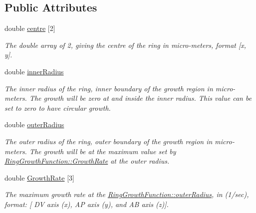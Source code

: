 \subsection*{Public Attributes}
\begin{DoxyCompactItemize}
\item 
\hypertarget{classRingGrowthFunction_a5b8f1cc72d03907bb1492e6c2f288db0}{}double \hyperlink{classRingGrowthFunction_a5b8f1cc72d03907bb1492e6c2f288db0}{centre} \mbox{[}2\mbox{]}\label{classRingGrowthFunction_a5b8f1cc72d03907bb1492e6c2f288db0}

\begin{DoxyCompactList}\small\item\em The double array of 2, giving the centre of the ring in micro-\/meters, format \mbox{[}x, y\mbox{]}. \end{DoxyCompactList}\item 
\hypertarget{classRingGrowthFunction_a4e8796fbbbe9fe18c2dcd04613effcf0}{}double \hyperlink{classRingGrowthFunction_a4e8796fbbbe9fe18c2dcd04613effcf0}{inner\+Radius}\label{classRingGrowthFunction_a4e8796fbbbe9fe18c2dcd04613effcf0}

\begin{DoxyCompactList}\small\item\em The inner radius of the ring, inner boundary of the growth region in micro-\/meters. The growth will be zero at and inside the inner radius. This value can be set to zero to have circular growth. \end{DoxyCompactList}\item 
\hypertarget{classRingGrowthFunction_a8b7d5268d9d47f112b56feef58193649}{}double \hyperlink{classRingGrowthFunction_a8b7d5268d9d47f112b56feef58193649}{outer\+Radius}\label{classRingGrowthFunction_a8b7d5268d9d47f112b56feef58193649}

\begin{DoxyCompactList}\small\item\em The outer radius of the ring, outer boundary of the growth region in micro-\/meters. The growth will be at the maximum value set by \hyperlink{classRingGrowthFunction_a93b70ff6a7258c73a6bd2d888d09fc09}{Ring\+Growth\+Function\+::\+Growth\+Rate} at the outer radius. \end{DoxyCompactList}\item 
\hypertarget{classRingGrowthFunction_a93b70ff6a7258c73a6bd2d888d09fc09}{}double \hyperlink{classRingGrowthFunction_a93b70ff6a7258c73a6bd2d888d09fc09}{Growth\+Rate} \mbox{[}3\mbox{]}\label{classRingGrowthFunction_a93b70ff6a7258c73a6bd2d888d09fc09}

\begin{DoxyCompactList}\small\item\em The maximum growth rate at the \hyperlink{classRingGrowthFunction_a8b7d5268d9d47f112b56feef58193649}{Ring\+Growth\+Function\+::outer\+Radius}, in (1/sec), format\+: \mbox{[} D\+V axis (x), A\+P axis (y), and A\+B axis (z)\mbox{]}. \end{DoxyCompactList}\end{DoxyCompactItemize}


